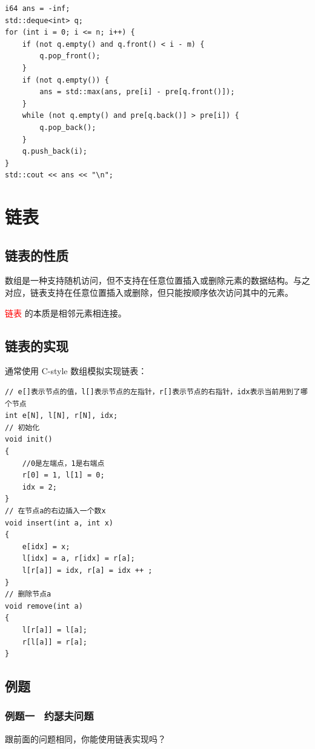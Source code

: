 \documentclass{report}
\begin{document}
\begin{verbatim}
i64 ans = -inf;
std::deque<int> q;
for (int i = 0; i <= n; i++) {
    if (not q.empty() and q.front() < i - m) {
        q.pop_front();
    }
    if (not q.empty()) {
        ans = std::max(ans, pre[i] - pre[q.front()]);
    }
    while (not q.empty() and pre[q.back()] > pre[i]) {
        q.pop_back();
    }
    q.push_back(i);
}
std::cout << ans << "\n";
\end{verbatim}

\chapter{链表}

\section{链表的性质}

数组是一种支持随机访问，但不支持在任意位置插入或删除元素的数据结构。与之对应，链表支持在任意位置插入或删除，但只能按顺序依次访问其中的元素。

\textcolor{red}{链表} 的本质是相邻元素相连接。

\section{链表的实现}

通常使用 C-style 数组模拟实现链表：

\begin{verbatim}
// e[]表示节点的值，l[]表示节点的左指针，r[]表示节点的右指针，idx表示当前用到了哪个节点
int e[N], l[N], r[N], idx;
// 初始化
void init()
{
    //0是左端点，1是右端点
    r[0] = 1, l[1] = 0;
    idx = 2;
}
// 在节点a的右边插入一个数x
void insert(int a, int x)
{
    e[idx] = x;
    l[idx] = a, r[idx] = r[a];
    l[r[a]] = idx, r[a] = idx ++ ;
}
// 删除节点a
void remove(int a)
{
    l[r[a]] = l[a];
    r[l[a]] = r[a];
}
\end{verbatim}

\section{例题}

\subsection{例题一 \ 约瑟夫问题}

跟前面的问题相同，你能使用链表实现吗？
\end{document}
